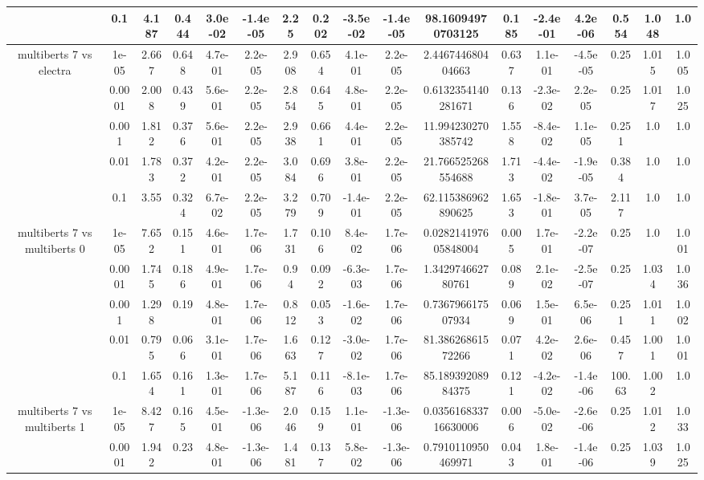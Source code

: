 \begin{tabular}{|c|c|c|c|c|c|c|c|c|c|c|c|c|c|c|c|c|}
 & 0.1 & 4.187 & 0.444 & 3.0e-02 & -1.4e-05 & 2.25 & 0.202 & -3.5e-02 & -1.4e-05 & 98.16094970703125 & 0.185 & -2.4e-01 & 4.2e-06 & 0.554 & 1.048 & 1.0 \\
\hline
\multirow{5}{*}{multiberts 7 vs electra } & 1e-05 & 2.667 & 0.648 & 4.7e-01 & 2.2e-05 & 2.908 & 0.654 & 4.1e-01 & 2.2e-05 & 2.446744680404663 & 0.637 & 1.1e-01 & -4.5e-05 & 0.25 & 1.015 & 1.005 \\
 & 0.0001 & 2.008 & 0.439 & 5.6e-01 & 2.2e-05 & 2.854 & 0.645 & 4.8e-01 & 2.2e-05 & 0.6132354140281671 & 0.136 & -2.3e-02 & 2.2e-05 & 0.25 & 1.017 & 1.025 \\
 & 0.001 & 1.812 & 0.376 & 5.6e-01 & 2.2e-05 & 2.938 & 0.661 & 4.4e-01 & 2.2e-05 & 11.994230270385742 & 1.558 & -8.4e-02 & 1.1e-05 & 0.251 & 1.0 & 1.0 \\
 & 0.01 & 1.783 & 0.372 & 4.2e-01 & 2.2e-05 & 3.084 & 0.696 & 3.8e-01 & 2.2e-05 & 21.766525268554688 & 1.713 & -4.4e-02 & -1.9e-05 & 0.384 & 1.0 & 1.0 \\
 & 0.1 & 3.55 & 0.324 & 6.7e-02 & 2.2e-05 & 3.279 & 0.709 & -1.4e-01 & 2.2e-05 & 62.115386962890625 & 1.653 & -1.8e-01 & 3.7e-05 & 2.117 & 1.0 & 1.0 \\
\hline
\multirow{5}{*}{multiberts 7 vs multiberts 0} & 1e-05 & 7.652 & 0.151 & 4.6e-01 & 1.7e-06 & 1.731 & 0.106 & 8.4e-02 & 1.7e-06 & 0.028214197605848004 & 0.005 & 1.7e-01 & -2.2e-07 & 0.25 & 1.0 & 1.001 \\
 & 0.0001 & 1.745 & 0.186 & 4.9e-01 & 1.7e-06 & 0.94 & 0.092 & -6.3e-03 & 1.7e-06 & 1.342974662780761 & 0.089 & 2.1e-02 & -2.5e-07 & 0.25 & 1.034 & 1.036 \\
 & 0.001 & 1.298 & 0.19 & 4.8e-01 & 1.7e-06 & 0.812 & 0.053 & -1.6e-02 & 1.7e-06 & 0.736796617507934 & 0.069 & 1.5e-01 & 6.5e-06 & 0.251 & 1.011 & 1.002 \\
 & 0.01 & 0.795 & 0.066 & 3.1e-01 & 1.7e-06 & 1.663 & 0.127 & -3.0e-02 & 1.7e-06 & 81.38626861572266 & 0.071 & 4.2e-02 & 2.6e-06 & 0.457 & 1.001 & 1.001 \\
 & 0.1 & 1.654 & 0.161 & 1.3e-01 & 1.7e-06 & 5.187 & 0.116 & -8.1e-03 & 1.7e-06 & 85.18939208984375 & 0.121 & -4.2e-02 & -1.4e-06 & 100.63 & 1.002 & 1.0 \\
\hline
\multirow{5}{*}{multiberts 7 vs multiberts 1} & 1e-05 & 8.427 & 0.165 & 4.5e-01 & -1.3e-06 & 2.046 & 0.159 & 1.1e-01 & -1.3e-06 & 0.035616833716630006 & 0.006 & -5.0e-02 & -2.6e-06 & 0.25 & 1.012 & 1.033 \\
 & 0.0001 & 1.942 & 0.23 & 4.8e-01 & -1.3e-06 & 1.481 & 0.137 & 5.8e-02 & -1.3e-06 & 0.7910110950469971 & 0.043 & 1.8e-01 & -1.4e-06 & 0.25 & 1.039 & 1.025 \\

\end{tabular}
